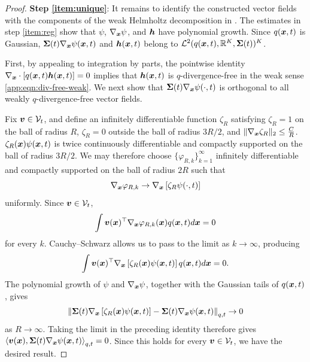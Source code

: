 \begin{proof}
\medskip
\textbf{Step \ref{item:unique}}:
It remains to identify the constructed vector fields with the components of the weak Helmholtz decomposition in
. 
The estimates in step \ref{item:reg} show that $\psi$, $\nabla_{\boldsymbol{x}}\psi$, and $\boldsymbol{h}$ have polynomial growth. 
Since $q(\boldsymbol{x},t)$ is Gaussian, $\boldsymbol{\Sigma}(t)\nabla_{\boldsymbol{x}}\psi(\boldsymbol{x},t)$ and $\boldsymbol{h}(\boldsymbol{x},t)$ belong to $\mathcal{L}^2(q(\boldsymbol{x}, t), \mathbb{R}^K, \boldsymbol{\Sigma}(t))^K$.

First, by appealing to integration by parts, the pointwise identity $\nabla_{\boldsymbol{x}}\cdot \left[q(\boldsymbol{x},t)\boldsymbol{h}(\boldsymbol{x},t)\right] = 0$ implies that $\boldsymbol{h}(\boldsymbol{x},t)$ is $q$-divergence-free in the weak sense \cref{app:eqn:div-free-weak}. 
We next show that $\boldsymbol{\Sigma}(t)\nabla_{\boldsymbol{x}}\psi(\cdot,t)$ is orthogonal to all weakly $q$-divergence-free vector fields.

Fix $\boldsymbol{v} \in \mathcal{V}_t$, and define an infinitely differentiable function $\zeta_R$ satisfying $\zeta_R=1$ on the ball of radius $R$, $\zeta_R=0$ outside the ball of radius $3R/2$, and $\|\nabla_{\boldsymbol{x}}\zeta_R\|_2 \leq \frac{C}{R}$.
$\zeta_R(\boldsymbol{x})\psi(\boldsymbol{x},t)$ is twice continuously differentiable and compactly supported on the ball of radius $3R/2$. 
We may therefore choose $\{\varphi_{R,k}\}_{k=1}^{\infty}$ infinitely differentiable and compactly supported on the ball of radius $2R$ such that
\begin{equation*}
    \nabla_{\boldsymbol{x}}\varphi_{R,k} \to \nabla_{\boldsymbol{x}}\left[    \zeta_R\psi(\cdot,t) \right]
\end{equation*}
uniformly. Since $\boldsymbol{v}\in\mathcal{V}_t$,
\begin{equation*}
    \int
    \boldsymbol{v}(\boldsymbol{x})^\top\nabla_{\boldsymbol{x}}\varphi_{R,k}(\boldsymbol{x})
    q(\boldsymbol{x},t)d\boldsymbol{x}
    =
    0
\end{equation*}
for every $k$. 
Cauchy--Schwarz allows us to pass to the limit as $k\to\infty$, producing
\begin{equation*}
    \int \boldsymbol{v}(\boldsymbol{x})^\top \nabla_{\boldsymbol{x}}\left[   \zeta_R(\boldsymbol{x})\psi(\boldsymbol{x},t) \right] q(\boldsymbol{x},t)d\boldsymbol{x} = 0.
\end{equation*}
The polynomial growth of $\psi$ and $\nabla_{\boldsymbol{x}}\psi$, together with the Gaussian tails of $q(\boldsymbol{x},t)$, gives
\begin{equation*}
\left\| \boldsymbol{\Sigma}(t) \nabla_{\boldsymbol{x}}\left[ \zeta_R(\boldsymbol{x})\psi(\boldsymbol{x},t) \right] - \boldsymbol{\Sigma}(t)\nabla_{\boldsymbol{x}}\psi(\boldsymbol{x},t) \right\|_{q, t} \to 0
\end{equation*}
as $R\to\infty$.
Taking the limit in the preceding identity therefore gives
$\left\langle \boldsymbol{v}(\boldsymbol{x}), \boldsymbol{\Sigma}(t)\nabla_{\boldsymbol{x}}\psi(\boldsymbol{x},t) \right\rangle_{q, t} = 0$. 
Since this holds for every $\boldsymbol{v} \in \mathcal{V}_t$, we have the desired result.


\end{proof}
